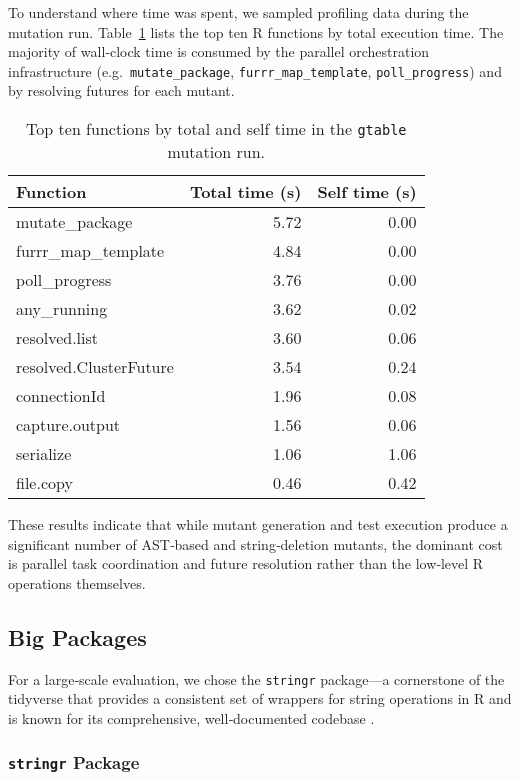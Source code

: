 To understand where time was spent, we sampled profiling data during the mutation run.  Table~\ref{tab:gtable-profile} lists the top ten R functions by total execution time.  The majority of wall‐clock time is consumed by the parallel orchestration infrastructure (e.g.\ \texttt{mutate\_package}, \texttt{furrr\_map\_template}, \texttt{poll\_progress}) and by resolving futures for each mutant.

\begin{table}[htbp]
  \centering
  \begin{tabular}{lrr}
    \hline\hline
    Function & Total time (s) & Self time (s) \\
    \hline
    mutate\_package & 5.72 & 0.00 \\
    furrr\_map\_template & 4.84 & 0.00 \\
    poll\_progress & 3.76 & 0.00 \\
    any\_running & 3.62 & 0.02 \\
    resolved.list & 3.60 & 0.06 \\
    resolved.ClusterFuture & 3.54 & 0.24 \\
    connectionId & 1.96 & 0.08 \\
    capture.output & 1.56 & 0.06 \\
    serialize & 1.06 & 1.06 \\
    file.copy & 0.46 & 0.42 \\
    \hline
  \end{tabular}
  \caption{Top ten functions by total and self time in the \texttt{gtable} mutation run.}
  \label{tab:gtable-profile}
\end{table}

These results indicate that while mutant generation and test execution produce a significant number of AST‐based and string‐deletion mutants, the dominant cost is parallel task coordination and future resolution rather than the low‐level R operations themselves.

\subsection{Big Packages}

For a large‐scale evaluation, we chose the \texttt{stringr} package—a cornerstone of the tidyverse that provides a consistent set of wrappers for string operations in R and is known for its comprehensive, well‐documented codebase \cite{stringr}.

\subsubsection{\texttt{stringr} Package}

